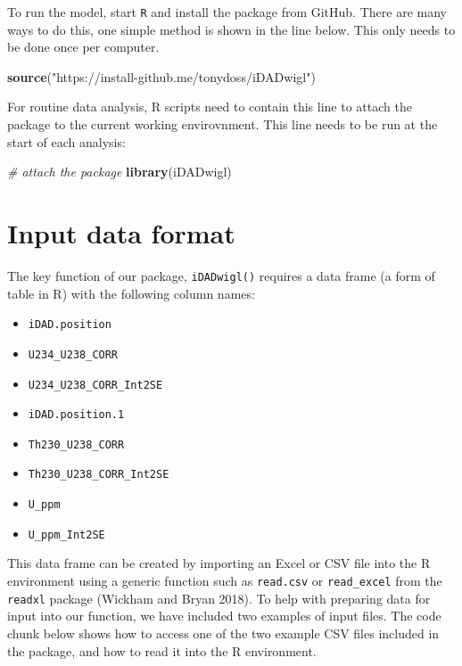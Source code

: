 \documentclass[]{elsarticle} %
\providecommand{\tightlist}{%
  \setlength{\itemsep}{0pt}\setlength{\parskip}{0pt}}
\newenvironment{Shaded}{\begin{snugshade}}{\end{snugshade}}
\newcommand{\CommentTok}[1]{\textcolor[rgb]{0.56,0.35,0.01}{\textit{#1}}}
\newcommand{\KeywordTok}[1]{\textcolor[rgb]{0.13,0.29,0.53}{\textbf{#1}}}
\newcommand{\NormalTok}[1]{#1}
\newcommand{\StringTok}[1]{\textcolor[rgb]{0.31,0.60,0.02}{#1}}
\begin{document}
To run the model, start \texttt{R} and install the package from GitHub. There are many ways to do this, one simple method is shown in the line below. This only needs to be done once per computer.

\begin{Shaded}
\begin{Highlighting}[]
\KeywordTok{source}\NormalTok{(}\StringTok{"https://install-github.me/tonydoss/iDADwigl"}\NormalTok{)}
\end{Highlighting}
\end{Shaded}

For routine data analysis, R scripts need to contain this line to attach the package to the current working envirovnment. This line needs to be run at the start of each analysis:

\begin{Shaded}
\begin{Highlighting}[]
\CommentTok{# attach the package}
\KeywordTok{library}\NormalTok{(iDADwigl)}
\end{Highlighting}
\end{Shaded}

\newpage

\hypertarget{input-data-format}{%
\section{Input data format}\label{input-data-format}}

The key function of our package, \texttt{iDADwigl()} requires a data frame (a form of table in R) with the following column names:

\begin{itemize}
\tightlist
\item
  \texttt{iDAD.position}
\item
  \texttt{U234\_U238\_CORR}
\item
  \texttt{U234\_U238\_CORR\_Int2SE}
\item
  \texttt{iDAD.position.1}
\item
  \texttt{Th230\_U238\_CORR}
\item
  \texttt{Th230\_U238\_CORR\_Int2SE}
\item
  \texttt{U\_ppm}
\item
  \texttt{U\_ppm\_Int2SE}
\end{itemize}

This data frame can be created by importing an Excel or CSV file into the R environment using a generic function such as \texttt{read.csv} or \texttt{read\_excel} from the \texttt{readxl} package (Wickham and Bryan 2018). To help with preparing data for input into our function, we have included two examples of input files. The code chunk below shows how to access one of the two example CSV files included in the package, and how to read it into the R environment.
\end{document}
